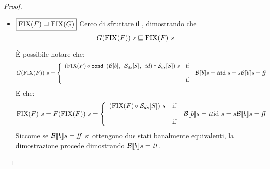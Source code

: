 {\begin{proof}
\begin{itemize}
  È possibile notare che:
  $$
  F(\fixp{G})\ s =
    \caseFun{(\fixp{G} \circ \dsCtxt{S})\ s}
            {\B{b} = \semtrue}
            {\idDS\ s = s}
            {\B{b} = \semfalse}
  $$
  Mentre il termine sulla destra evolve nel seguente modo:
  $$
  \fixp{G}\ s= G(\fixp{G})\ s =
    \caseFun{(\fixp{G} \circ \cond{b}{\dsCtxt{S}}{id} \circ \dsCtxt{S})\ s}
            {\B{b} = \semtrue}
            {\idDS\ s = s}
            {\B{b} = \semfalse}
  $$
  Il caso $\B{b} = \semfalse$ è banalmente verificato. Si dimostra quindi la
  tesi per il caso $\B{b} = \semtrue$, riducendo il termine sulla sinistra:
  $$
  (\fixp{G} \circ \dsCtxt{S})\ s =
    \caseFun{\fixp{G}\ s'}
            {\dsCtxt{S}\ s = s'}
            {\undefDS}
            {\dsCtxt{S}\ s = \undefDS}
  $$
  Mentre per il termine sulla destra vale:
  $$
  \fixp{G}\ s= G(\fixp{G})\ s =
    \caseFun{(\fixp{G} \circ \cond{b}{\dsCtxt{S}}{id})\ s'}
            {\dsCtxt{S}\ s = s'}
            {\undefDS}
            {\dsCtxt{S}\ s = \undefDS}
  $$
  Il caso $\dsCtxt{S}\ s = \undefDS$ è banalmente verificato, perciò occorre
  solamente verificare il caso $\dsCtxt{S} = s'$:
  $$
  \fixp{G}\ s' = G(\fixp{G})\ s' = 
    \caseFun{(\fixp{G} \circ \cond{b}{\dsCtxt{S}}{id} \circ \dsCtxt{S})\ s'}
            {\B{b}' = \semtrue}
            {s'}
            {\B{b}' = \semfalse}
  $$
  Mentre per il termine sulla destra:
  $$
  (\fixp{G} \circ \cond{b}{\dsCtxt{S}}{id})\ s' =
    \caseFun{(\fixp{G} \circ \dsCtxt{S}) s'}
            {\B{b}' = \semtrue}
            {(\fixp{G} \circ \idDS)\ s' = (\fixp{G})\ s'}
            {\B{b}' = \semfalse}
  $$
  Ma nel caso $\B{b}' = \semfalse$, $(\fixp{G}) s'$ è proprio $s'$ poichè:
  $$
  \begin{array}{lr}
  (\fixp{G}) s' = & \text{(applicazione punto fisso)} \\
  G (\fixp{G}) s' = & \B{b}' = \semfalse \\
  \idDS\ s' = & \text{(definizione \idDS)} \\
  s' & \\
  \end{array}
  $$
  Resta dunque da provare che, nel caso $\B{b}' = \semtrue$, si ha:
  $$
  (\fixp{G} \circ \cond{b}{\dsCtxt{S}}{id} \circ \dsCtxt{S})\ s' =
  (\fixp{G} \circ \dsCtxt{S}) s'
  $$

  \item $\boxed{\textrm{\normalfont{FIX}}(F) \sqsupseteq \textrm{\normalfont{FIX}}(G)}$
  Cerco di sfruttare il \FPIL, dimostrando che
  $$
  G(\fixp{F})\ s \sqsubseteq \fixp{F}\ s
  $$

  È possibile notare che:
  $$
  G(\fixp{F})\ s =
    \caseFun{(\fixp{F} \circ
                 \cond{b}{\dsCtxt{S}}{id} \circ \dsCtxt{S})\ s}
            {\B{b} = \semtrue}
            {\idDS\ s = s}
            {\B{b} = \semfalse}
  $$
  E che:
  $$
  \fixp{F}\ s = F(\fixp{F})\ s =
    \caseFun{(\fixp{F} \circ \dsCtxt{S})\ s}
            {\B{b} = \semtrue}
            {\idDS\ s = s}
            {\B{b} = \semfalse}
  $$
  Siccome se $\B{b} = \semfalse$ si ottengono due stati banalmente equivalenti,
  la dimostrazione procede dimostrando $\B{b} = \semtrue$.


\end{itemize}
\end{proof}}
